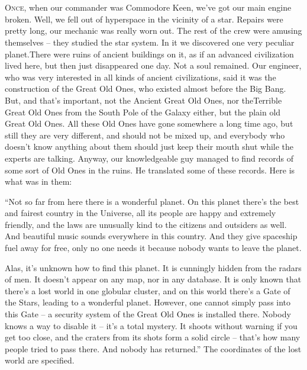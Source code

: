 \documentclass[ebook,twoside,final,openright]{memoir}
\begin{document}
\chapter{}
\par
\lettrine{O}{nce,} when our commander was Commodore Keen, we’ve got our main engine broken. Well, we fell out of hyperspace in the vicinity of a star. Repairs were pretty long, our mechanic was really worn out. The rest of the crew were amusing themselves – they studied the star system. In it we discovered one very peculiar planet.There were ruins of ancient buildings on it, as if an advanced civilization lived here, but then just disappeared one day. Not a soul remained. Our engineer, who was very interested in all kinds of ancient civilizations, said it was the construction of the Great Old Ones, who existed almost before the Big Bang. But, and that’s important, not the Ancient Great Old Ones, nor theTerrible Great Old Ones from the South Pole of the Galaxy either, but the plain old Great Old Ones. All these Old Ones have gone somewhere a long time ago, but still they are very different, and should not be mixed up, and everybody who doesn’t know anything about them should just keep their mouth shut while the experts are talking. Anyway, our knowledgeable guy managed to find records of some sort of Old Ones in the ruins. He translated some of these records. Here is what was in them:\par
\par
“Not so far from here there is a wonderful planet. On this planet there’s the best and fairest country in the Universe, all its people are happy and extremely friendly, and the laws are unusually kind to the citizens and outsiders as well. And beautiful music sounds everywhere in this country. And they give spaceship fuel away for free, only no one needs it because nobody wants to leave the planet. \par
Alas, it’s unknown how to find this planet. It is cunningly hidden from the radars of men. It doesn’t appear on any map, nor in any database. It is only known that there’s a lost world in one globular cluster, and on this world there’s a Gate of the Stars, leading to a wonderful planet. However, one cannot simply pass into this Gate – a security system of the Great Old Ones is installed there. Nobody knows a way to disable it – it’s a total mystery. It shoots without warning if you get too close, and the craters from its shots form a solid circle – that's how many people tried to pass there. And nobody has returned.” The coordinates of the lost world are specified.\par
\end{document}

